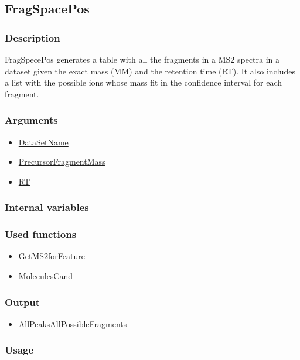 \subsection{FragSpacePos}\label{FragSpacePos}
\subsubsection{Description}
FragSpecePos generates a table with all the fragments in a MS2 spectra in a dataset given the exact mass (MM) and the retention time (RT). It also includes a list with the possible ions whose mass fit in the confidence interval for each fragment.
\subsubsection{Arguments}
\begin{itemize}
\item \hyperref[DataSetName]{DataSetName}
\item \hyperref[PrecursorFragmentMass]{PrecursorFragmentMass}
\item \hyperref[RT]{RT}
\end{itemize}
\subsubsection{Internal variables}
\subsubsection{Used functions}
\begin{itemize}
\item \hyperref[GetMS2forFeature]{GetMS2forFeature}
\item \hyperref[MoleculesCand]{MoleculesCand}
\end{itemize}
\subsubsection{Output}
\begin{itemize}
\item \hyperref[AllPeaksAllPossibleFragments]{AllPeaksAllPossibleFragments}
\end{itemize}
\subsubsection{Usage}
